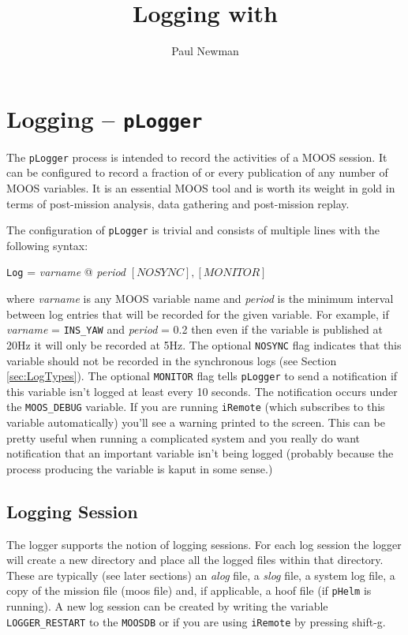 \documentclass[a4paper,10pt]{article}
\title{Logging with \code{pLogger}}
\author{Paul Newman}
\newcommand{\Code}[1]{\texttt{#1} }
\newcommand{\code}[1]{\Code{#1} }
\begin{document}
\maketitle

\begin{center}
\end{center}

\section{Logging -- \code{pLogger}}
The \code{pLogger} process is intended to record the activities of
a MOOS session. It can be configured to record a fraction of or
every publication of any number of MOOS variables. It is an
essential MOOS tool and is worth its weight in gold in terms of
post-mission analysis, data gathering and post-mission replay.

The configuration of \code{pLogger} is trivial and consists of
multiple lines with the following syntax:
\begin{center}
\code{Log} =  {\it{varname}} @ {\it{period}} $[NOSYNC],[MONITOR]$
\end{center}
where {\it{varname}} is any MOOS variable name and {\it{period}}
is the minimum interval between log entries that will be recorded
for the given variable. For example, if
{\it{varname}} = \code{INS\_YAW} and {\it{period}} = 0.2 then even
if the variable is published at 20Hz it will only be recorded at
5Hz. The optional \code{NOSYNC} flag indicates that this variable
should not be recorded in the synchronous logs (see Section
\ref{sec:LogTypes}). The optional \code{MONITOR} flag tells \code{pLogger} to send a notification if this variable isn't logged at least every 10 seconds. The notification occurs under the \code{MOOS\_DEBUG} variable. If you are running \code{iRemote} (which subscribes to this variable
automatically) you'll see a warning printed to the screen. This can be pretty useful when running
a complicated system and you really do want notification that an important variable isn't being logged (probably because the process producing the variable is kaput in some sense.)

\subsection{Logging Session}

The logger supports the notion of logging sessions. For each log session the logger will create a new directory and place all the logged files within that directory. These are typically (see later sections) an {\it{alog}} file, a {\it{slog}} file, a system log file, a copy of the mission file (moos file) and, if applicable, a hoof file (if  \code{pHelm} is running). A new log session can be created by writing the variable \code{LOGGER\_RESTART} to the \code{MOOSDB} or if you are using \code{iRemote} by pressing shift-g.
\end{document}
